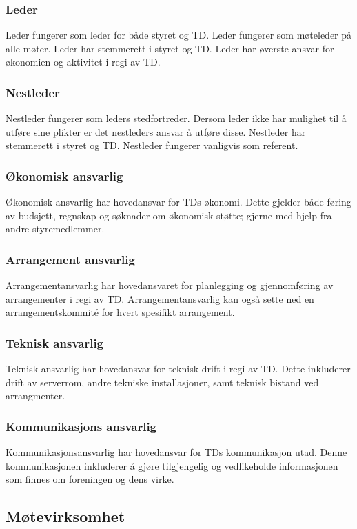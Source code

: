 \documentclass[11pt]{article}
\begin{document}
\subsubsection{Leder}
Leder fungerer som leder for både styret og TD. Leder fungerer som møteleder på alle møter. Leder har stemmerett i styret og TD. Leder har øverste ansvar for økonomien og aktivitet i regi av TD.
\subsubsection{Nestleder}
Nestleder fungerer som leders stedfortreder. Dersom leder ikke har mulighet til å utføre sine plikter er det nestleders ansvar å utføre disse. Nestleder har stemmerett i styret og TD. Nestleder fungerer vanligvis som referent.
\subsubsection{Økonomisk ansvarlig}
Økonomisk ansvarlig har hovedansvar for TDs økonomi. Dette gjelder både føring av budsjett, regnskap og søknader om økonomisk støtte; gjerne med hjelp fra andre styremedlemmer.
\subsubsection{Arrangement ansvarlig}
Arrangementansvarlig har hovedansvaret for planlegging og gjennomføring av arrangementer i regi av TD. Arrangementansvarlig kan også sette ned en arrangementskommité for hvert spesifikt arrangement.
\subsubsection{Teknisk ansvarlig}
Teknisk ansvarlig har hovedansvar for teknisk drift i regi av TD. Dette inkluderer drift av serverrom, andre tekniske installasjoner, samt teknisk bistand ved arrangmenter.

\subsubsection{Kommunikasjons ansvarlig}
Kommunikasjonsansvarlig har hovedansvar for TDs kommunikasjon utad. Denne kommunikasjonen inkluderer å gjøre tilgjengelig og vedlikeholde
informasjonen som finnes om foreningen og dens virke.

\subsection{Møtevirksomhet}
\end{document}
